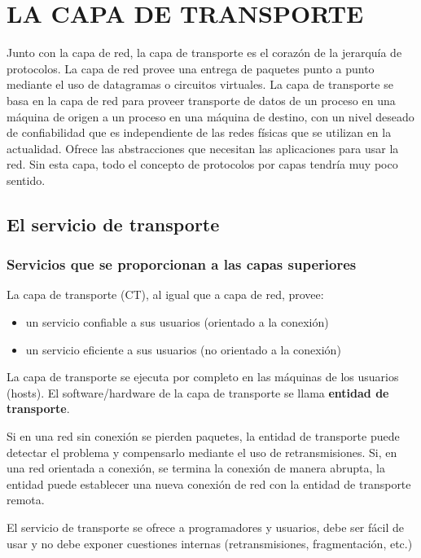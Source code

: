 \documentclass[10pt,a4paper]{report}
\begin{document}
\chapter{LA CAPA DE TRANSPORTE}
\par Junto con la capa de red, la capa de transporte es el corazón de la jerarquía de 
protocolos. La capa de red provee una entrega de paquetes punto a punto mediante 
el uso de datagramas o circuitos virtuales. La capa de transporte se basa en la capa 
de red para proveer transporte de datos de un proceso en una máquina de origen a 
un proceso en una máquina de destino, con un nivel deseado de confiabilidad que es 
independiente de las redes físicas que se utilizan en la actualidad. Ofrece las 
abstracciones que necesitan las aplicaciones para usar la red. Sin esta capa, todo el 
concepto de protocolos por capas tendría muy poco sentido.


\section{El servicio de transporte}
\subsection{Servicios que se proporcionan a las capas superiores}
\par La capa de transporte (CT), al igual que a capa de red, provee:
	\begin{itemize}
		\item un servicio confiable a sus usuarios (orientado a la conexión)
		\item un servicio eficiente a sus usuarios (no orientado a la conexión)
	\end{itemize}
	
\par La capa de transporte se ejecuta por completo en las máquinas de los usuarios 
(hosts). El software/hardware de la capa de transporte se llama \textbf{entidad de 
transporte}.

\par Si en una red sin conexión se pierden paquetes, la entidad de transporte puede 
detectar el problema y compensarlo mediante el uso de retransmisiones. Si, en una 
red orientada a conexión, se termina la conexión de manera abrupta, la entidad puede 
establecer una nueva conexión de red con la entidad de transporte remota.
\par El servicio de transporte se ofrece a programadores y usuarios, debe ser fácil de 
usar y no debe exponer cuestiones internas (retransmisiones, fragmentación, etc.)
\end{document}
